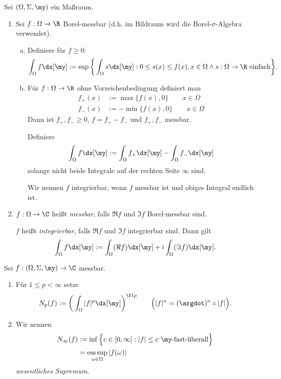 \begin{df}
	Sei $(\Omega, \Sigma, \my)$ ein Maßraum.
	
	\begin{enumerate}[1)]
		\item
			Sei $f: \Omega \to \R$ Borel-messbar (d.h. im Bildraum wird die Borel-$\sigma$-Algebra verwendet).

			\begin{enumerate}[a)]
				\item
					Definiere für $f \ge 0$:
					\[
						\int_{\Omega} f \dx[\my] 
						:= \sup \bigg\{ \int_{\Omega} s \dx[\my] : 0 \le s(x) \le f(x), x \in \Omega \land s : \Omega \to \R \text{ einfach} \bigg\}.
					\]
				\item
					Für $f: \Omega \to \R$ ohne Vorzeichenbedingung definiert man
					\begin{align*}
						f_+ (x) &:= \max\{f(x), 0 \} \qquad x \in \Omega \\
						f_- (x) &:= -\min\{ f(x), 0 \} \qquad x \in \Omega
					\end{align*}
					Dann ist $f_+, f_- \ge 0$, $f = f_+ - f_-$ und $f_+, f_-$ messbar.
					
					Definiere
					\[
						\int_{\Omega} f \dx[\my] := \int_{\Omega} f_+ \dx[\my] - \int_{\Omega} f_- \dx[\my]
					\]
					solange nicht beide Integrale auf der rechten Seite $\infty$ sind.

					Wir nennen $f$ integrierbar, wenn $f$ messbar ist und obiges Integral endlich ist.
			\end{enumerate}
		\item
			$f : \Omega \to \C$ heißt \emph{messbar}, falls $\Re f$ und $\Im f$ Borel-messbar sind.

			$f$ heißt \emph{integrierbar}, falls $\Re f$ und $\Im f$ integrierbar sind. 
			Dann gilt
			\[
				\int_{\Omega} f \dx[\my] := \int_{\Omega} (\Re f) \dx[\my] + i \int_{\Omega} (\Im f) \dx[\my] .
			\]
	\end{enumerate}

\end{df}
	

\begin{df} \label{2.4}
	Sei $f: (\Omega, \Sigma, \my) \to \C$ messbar.
	\begin{enumerate}[1)]
		\item
			Für $1 \le p < \infty$ setze
			\[
				N_p(f) := \bigg( \int_{\Omega} |f|^p \dx[\my] \bigg)^{\f 1p}
				\qquad \Big( |f|^n = (\argdot)^n \circ |f| \Big).
			\]
		\item
			Wir nennen
			\begin{align*}
					\displaystyle N_\infty(f) 
					&:= \inf \Big\{ c \in [0,\infty] : |f|\le c \text{ $\my$-fast-überall} \Big\} \\
					&= \esssup_{\omega \in \Omega} |f(\omega)|
			\end{align*}
			\emph{wesentliches Supremum}.
	\end{enumerate}
\end{df}


